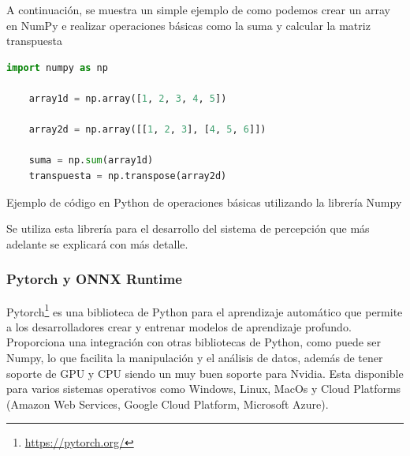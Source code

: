A continuación, se muestra un simple ejemplo de como podemos crear un array en NumPy e realizar operaciones básicas como la suma y calcular la matriz transpuesta

\begin{code}[h]
  \begin{lstlisting}[language=Python]
    import numpy as np

    array1d = np.array([1, 2, 3, 4, 5])

    array2d = np.array([[1, 2, 3], [4, 5, 6]])

    suma = np.sum(array1d)  
    transpuesta = np.transpose(array2d)  
  \end{lstlisting}
  \caption[Ejemplo de código en Python de operaciones básicas utilizando la librería Numpy]{Ejemplo de código en Python de operaciones básicas utilizando la librería Numpy}
  \label{cod:Numpy}
  \end{code}  

Se utiliza esta librería para el desarrollo del sistema de percepción que más adelante se explicará con más detalle. 

\subsubsection{Pytorch y ONNX Runtime}
\label{sec:pytorchandonnx}
Pytorch\footnote{\url{https://pytorch.org/}} es una biblioteca de Python para el aprendizaje automático que permite a 
los desarrolladores crear y entrenar modelos de aprendizaje profundo. Proporciona una integración con otras bibliotecas de Python, como puede ser
Numpy, lo que facilita la manipulación y el análisis de datos, además de tener soporte de GPU y CPU siendo un muy buen soporte para Nvidia. Esta disponible para varios sistemas operativos 
como Windows, Linux, MacOs y Cloud Platforms (Amazon Web Services, Google Cloud Platform, Microsoft Azure).\newline

